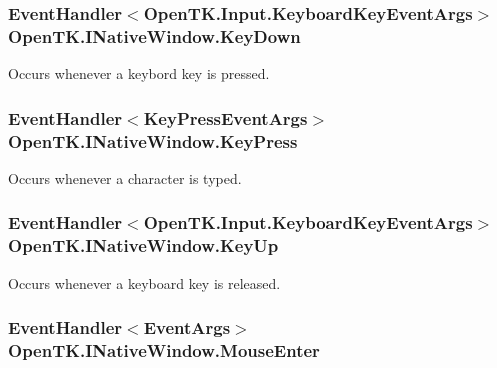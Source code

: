 \hypertarget{interface_open_t_k_1_1_i_native_window_a85cebd106b9852b2c6566ef026b55962}{
\subsubsection[{Key\-Down}]{\setlength{\rightskip}{0pt plus 5cm}Event\-Handler$<${\bf Open\-T\-K.\-Input.\-Keyboard\-Key\-Event\-Args}$>$ Open\-T\-K.\-I\-Native\-Window.\-Key\-Down}}\label{interface_open_t_k_1_1_i_native_window_a85cebd106b9852b2c6566ef026b55962}


Occurs whenever a keybord key is pressed. 

\hypertarget{interface_open_t_k_1_1_i_native_window_ade20fbd09d4d714240faa4ca4617cf3f}{
\subsubsection[{Key\-Press}]{\setlength{\rightskip}{0pt plus 5cm}Event\-Handler$<${\bf Key\-Press\-Event\-Args}$>$ Open\-T\-K.\-I\-Native\-Window.\-Key\-Press}}\label{interface_open_t_k_1_1_i_native_window_ade20fbd09d4d714240faa4ca4617cf3f}


Occurs whenever a character is typed. 

\hypertarget{interface_open_t_k_1_1_i_native_window_ab835df3fcdda59e03027d1f2b200d8b8}{
\subsubsection[{Key\-Up}]{\setlength{\rightskip}{0pt plus 5cm}Event\-Handler$<${\bf Open\-T\-K.\-Input.\-Keyboard\-Key\-Event\-Args}$>$ Open\-T\-K.\-I\-Native\-Window.\-Key\-Up}}\label{interface_open_t_k_1_1_i_native_window_ab835df3fcdda59e03027d1f2b200d8b8}


Occurs whenever a keyboard key is released. 

\hypertarget{interface_open_t_k_1_1_i_native_window_a4334f6f15abee869953af0845bd4dd41}{
\subsubsection[{Mouse\-Enter}]{\setlength{\rightskip}{0pt plus 5cm}Event\-Handler$<$Event\-Args$>$ Open\-T\-K.\-I\-Native\-Window.\-Mouse\-Enter}}\label{interface_open_t_k_1_1_i_native_window_a4334f6f15abee869953af0845bd4dd41}


